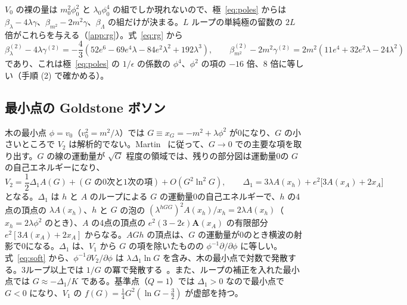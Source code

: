 \documentclass[a4paper,10pt]{ltjsarticle}
\begin{document}
$V_0$ の裸の量は $m_0^2\phi_0^2$ と $\lambda_0\phi_0^4$ の組でしか現れないので、極~\eqref{eq:poles} からは $\beta_\lambda-4\lambda\gamma$、$\beta_{m^2}-2m^2\gamma$、$\beta_\Lambda$ の組だけが決まる。$L$ ループの単純極の留数の $2L$ 倍がこれらを与える（\ref{app:rg}）。式~\eqref{eq:rg} から
\begin{equation}
\beta_\lambda^{(2)}-4\lambda\gamma^{(2)}=-\frac43(52e^6-69e^4\lambda-84e^2\lambda^2+192\lambda^3),\qquad
\beta_{m^2}^{(2)}-2m^2\gamma^{(2)}=2m^2(11e^4+32e^2\lambda-24\lambda^2)
\label{eq:rgcomb}
\end{equation}
であり、これは極~\eqref{eq:poles} の $1/\epsilon$ の係数の $\phi^4$、$\phi^2$ の項の $-16$ 倍、$8$ 倍に等しい（手順 (2) で確かめる）。

\subsection{最小点の Goldstone ボソン}\label{sec:goldstone}

木の最小点 $\phi=v_0$（$v_0^2=m^2/\lambda$）では $G\equiv x_G=-m^2+\lambda\phi^2$ が0になり、$G$ の小さいところで $V_2$ は解析的でない。Martin~\cite{martin14} に従って、$G\to0$ での主要な項を取り出す。$G$ の線の運動量が $\sqrt G$ 程度の領域では、残りの部分図は運動量0の $G$ の自己エネルギーになり、
\begin{equation}
V_2=\frac12\Delta_1A(G)+(\text{$G$ の0次と1次の項})+O(G^2\ln^2G),\qquad
\Delta_1=3\lambda A(x_h)+e^2\bigl[3A(x_A)+2x_A\bigr]
\label{eq:soft}
\end{equation}
となる。$\Delta_1$ は $h$ と $A$ のループによる $G$ の運動量0の自己エネルギーで、$h$ の4点の頂点の $\lambda A(x_h)$、$h$ と $G$ の泡の $(\lambda^{hGG})^2A(x_h)/x_h=2\lambda A(x_h)$（$x_h=2\lambda\phi^2$ のとき）、$A$ の4点の頂点の $e^2(3-2\epsilon)\mathbf A(x_A)$ の有限部分 $e^2[3A(x_A)+2x_A]$ からなる。$AGh$ の頂点は、$G$ の運動量が0のとき横波の射影で0になる。$\Delta_1$ は、$V_1$ から $G$ の項を除いたものの $\phi^{-1}\partial/\partial\phi$ に等しい。式~\eqref{eq:soft} から、$\phi^{-1}\partial V_2/\partial\phi$ は $\lambda\Delta_1\ln G$ を含み、木の最小点で対数で発散する。3ループ以上では $1/G$ の冪で発散する~\cite{martin14}。また、ループの補正を入れた最小点では $G\approx-\Delta_1/K$ である。基準点（$Q=1$）では $\Delta_1>0$ なので最小点で $G<0$ になり、$V_1$ の $f(G)=\frac14G^2(\ln G-\frac32)$ が虚部を持つ。
\end{document}
